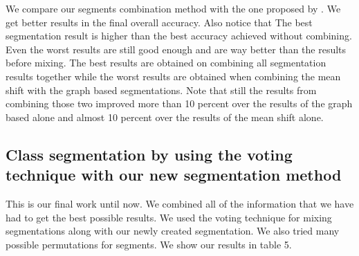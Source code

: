 \documentclass[twoside,11pt]{article}
\begin{document}
We compare our segments combination method with the one proposed by
\cite{PSH08}. We get better results in the final overall accuracy. Also notice
that
The best segmentation result is higher than the best accuracy achieved without
combining. Even the worst results are still good enough
and are way better than the results before mixing. The best results are obtained
on combining all segmentation results together while
the worst results are obtained when combining the mean shift with the graph
based segmentations. Note that still the results from combining those two
improved more than 10 percent over the results of the graph based alone and
almost 10 percent over the results of the mean shift alone.

\subsection{Class segmentation by using the voting technique with our new
segmentation method}

This is our final work until now. We combined all of the information that we
have had to get the best possible results. We used
the voting technique for mixing segmentations along with our newly created
segmentation. We also tried many possible permutations
for segments. We show our results in table 5.
\end{document}
